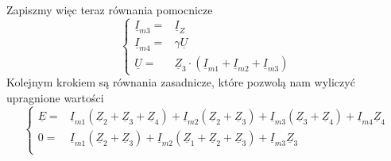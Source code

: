 \documentclass[12pt, a4paper]{article}
\begin{document}
Zapiszmy więc teraz równania pomocnicze
\begin{equation*}
  \left\{
  \begin{array}{rl}
    \underline{I}_{m3} = & \underline{I}_Z                                                                              \\
    \underline{I}_{m4} = & \gamma \underline{U}                                                                         \\
    \underline{U} =      & \underline{Z}_3 \cdot \left(\underline{I}_{m1}+ \underline{I}_{m2}+\underline{I}_{m3}\right)
  \end{array}
  \right.
\end{equation*}
Kolejnym krokiem są równania zasadnicze, które pozwolą nam wyliczyć upragnione
wartości
\begin{equation}\label{3.2o_zasadnicze}
  \left\{
  \begin{array}{rl}
    \underline{E} = & \underline{I}_{m1}(\underline{Z}_2+\underline{Z}_3+\underline{Z}_4) +\underline{I}_{m2}(\underline{Z}_2+\underline{Z}_3) +\underline{I}_{m3}(\underline{Z}_3+\underline{Z}_4) +\underline{I}_{m4}\underline{Z}_4 \\
    0 =             & \underline{I}_{m1}(\underline{Z}_2+\underline{Z}_3) +\underline{I}_{m2}(\underline{Z}_1+\underline{Z}_2+\underline{Z}_3) +\underline{I}_{m3}\underline{Z}_3                                                      \\
  \end{array}
  \right.
\end{equation}
\end{document}

